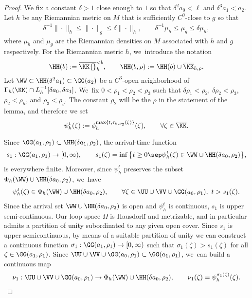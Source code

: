 \begin{proof}
We fix a constant $\delta>1$ close enough to $1$ so that
$\delta^2a_0<\ell$ and $\delta^3a_1<a_2$.
Let $h$ be any Riemannian metric on $M$ that is sufficiently $C^0$-close to $g$ so that
\begin{align*}
\delta^{-1}\|{\cdot}\|_h
\leq
\|{\cdot}\|_{g}
\leq
\delta\|{\cdot}\|_h,
\qquad
\delta^{-1}\mu_h
\leq
\mu_{g}
\leq
\delta\mu_h,
\end{align*}
where $\mu_h$ and $\mu_g$ are the Riemannian densities on $M$ associated with $h$ and $g$ respectively.
For the Riemannian metric $h$, we~introduce the notation
\begin{align*}
\HH(b):=\overline\KK{}_{h}^{<b},
\qquad
\HH(b,\rho):=
\HH(b)\cup\overline\KK_{h,\rho}.
\end{align*}
Let $\WW\subset\HH(\delta^2a_1)\subset\GG(a_2)$ be a $C^3$-open neighborhood of $\Gamma_h(\KK)\cap L_h^{-1}[\delta a_0,\delta a_1]$. We~fix $0<\rho_1<\rho_2<\rho_3$ such that $\delta\rho_1<\rho_2$, $\delta\rho_2<\rho_3$, $\rho_2<\rho_h$, and $\rho_3<\rho_g$. The constant $\rho_2$ will be the $\rho$ in the statement of the lemma, and therefore we set
\begin{align*}
\psi_h^t(\zeta):=\phi_h^{\max\{t,\tau_{h,\rho_2}(\zeta)\}}(\zeta),\qquad\forall\zeta\in\overline\KK.
\end{align*}

Since
$\GG(a_1,\rho_1)
\subset
\HH(\delta a_1,\rho_2)$, the arrival-time function
\begin{gather*}
s_1 :\GG(a_1,\rho_1)\to[0,\infty),
\qquad
s_1(\zeta) =\inf\big\{t\geq0\sep \psi_h^t(\zeta)\in \WW\cup\HH(\delta a_0,\rho_2) \big\},
\end{gather*}
is everywhere finite. Moreover, since $\psi_h^t$ preserves the subset $\Phi_h(\WW)\cup\HH(\delta a_0,\rho_2)$, we~have
\begin{align*}
\psi_h^t(\zeta)\in\Phi_h(\WW)\cup\HH(\delta a_0,\rho_2),
\qquad
\forall\zeta\in\UU\cup\VV\cup\GG(a_0,\rho_1),\ t> s_1(\zeta).
\end{align*}
Since the arrival set $\WW\cup\HH(\delta a_0,\rho_2)$ is open and $\psi_h^t$ is continuous, $s_1$ is upper semi-continuous. Our loop space $\Omega$ is Hausdorff and metrizable, and in particular admits a partition of unity subordinated to any given open cover. Since $s_1$ is upper semicontinuous, by means of a suitable partition of unity we can construct a continuous function $\sigma_1:\GG(a_1,\rho_1)\to[0,\infty)$ such that $\sigma_1(\zeta)> s_1(\zeta)$ for all $\zeta\in \GG(a_1,\rho_1)$. Since $\UU\cup\VV\cup\GG(a_0,\rho_1)\subset\GG(a_1,\rho_1)$, we~can build a continuous map
\begin{align*}
\nu_1: \UU\cup\VV\cup\GG(a_0,\rho_1)\to\Phi_h(\WW)\cup\HH(\delta a_0,\rho_2),
\qquad
\nu_1(\zeta)=\psi_h^{\sigma_1(\zeta)}(\zeta).
\end{align*}


\end{proof}

